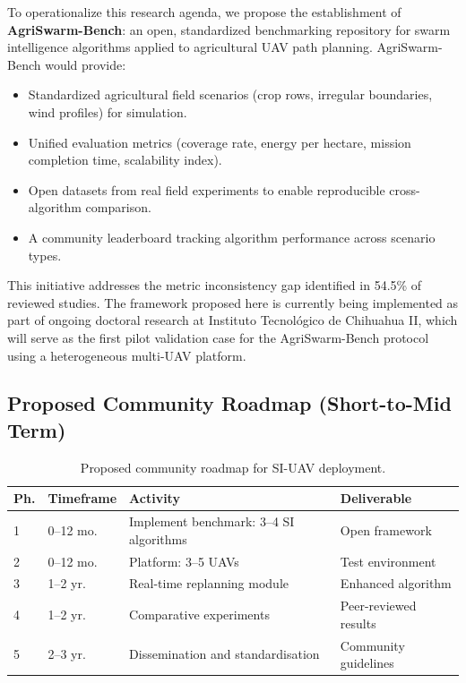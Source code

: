 \documentclass[review,3p,times]{elsarticle}
\begin{document}
To operationalize this research agenda, we propose the establishment of \textbf{AgriSwarm-Bench}: an open, standardized benchmarking repository for swarm intelligence algorithms applied to agricultural UAV path planning. AgriSwarm-Bench would provide:
\begin{itemize}
  \item Standardized agricultural field scenarios (crop rows, irregular boundaries, wind profiles) for simulation.
  \item Unified evaluation metrics (coverage rate, energy per hectare, mission completion time, scalability index).
  \item Open datasets from real field experiments to enable reproducible cross-algorithm comparison.
  \item A community leaderboard tracking algorithm performance across scenario types.
\end{itemize}

This initiative addresses the metric inconsistency gap identified in 54.5\% of reviewed studies. The framework proposed here is currently being implemented as part of ongoing doctoral research at Instituto Tecnológico de Chihuahua II, which will serve as the first pilot validation case for the AgriSwarm-Bench protocol using a heterogeneous multi-UAV platform.

\subsection{Proposed Community Roadmap (Short-to-Mid Term)}
\begin{table}[htbp]
\centering
\caption{Proposed community roadmap for SI-UAV deployment.}
\label{tab:roadmap}
\begin{tabularx}{\textwidth}{llXl}
\toprule
\textbf{Ph.} & \textbf{Timeframe} & \textbf{Activity} & \textbf{Deliverable} \\
\midrule
1 & 0--12 mo. & Implement benchmark: 3--4 SI algorithms & Open framework \\
2 & 0--12 mo. & Platform: 3--5 UAVs & Test environment \\
3 & 1--2 yr. & Real-time replanning module & Enhanced algorithm \\
4 & 1--2 yr. & Comparative experiments & Peer-reviewed results \\
5 & 2--3 yr. & Dissemination and standardisation & Community guidelines \\
\bottomrule
\end{tabularx}
\end{table}
\end{document}
